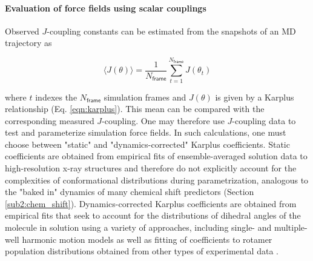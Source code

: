 \documentclass[9pt,review]{livecoms}
\begin{document}
\paragraph{Evaluation of force fields using scalar couplings}

Observed $J$-coupling constants can be estimated from the snapshots of an MD trajectory as

\begin{equation}
\label{eqn:j_coupling_estimate}
\langle J(\theta) \rangle = \frac {1} {N_\mathsf{frame}} \sum_{t=1}^{N_{\mathsf{frame}}} J(\theta_t)
\end{equation}

\noindent where $t$ indexes the $N_{\mathsf{frame}}$ simulation frames and $J(\theta)$ is given by a Karplus relationship (Eq. \ref{eqn:karplus}).
This mean can be compared with the corresponding measured $J$-coupling.
One may therefore use $J$-coupling data to test \cite{graf_structure_2007,best_are_2008,beauchamp_are_2012,Maier:2015:J.Chem.TheoryComput.} and parameterize \cite{best_optimized_2009,piana_how_2011,best_optimization_2012,best_balanced_2014,Maier:2015:J.Chem.TheoryComput.,robustelli_developing_2018} simulation force fields.
In such calculations, one must choose between "static" and "dynamics-corrected" Karplus coefficients.
Static coefficients are obtained from empirical fits of ensemble-averaged solution data to high-resolution x-ray structures and therefore do not explicitly account for the complexities of conformational distributions during parametrization, analogous to the "baked in" dynamics of many chemical shift predictors (Section \ref{sub2:chem_shift}).
Dynamics-corrected Karplus coefficients are obtained from empirical fits that seek to account for the distributions of dihedral angles of the molecule in solution using a variety of approaches, including single- and multiple-well harmonic motion models as well as fitting of coefficients to rotamer population distributions obtained from other types of experimental data \cite{brueschweiler_adding_1994,case_static_2000,chou_insights_2003,lindorff-larsen_interpreting_2005,vogeli_limits_2007,lee_quantitative_2015}.
\end{document}
